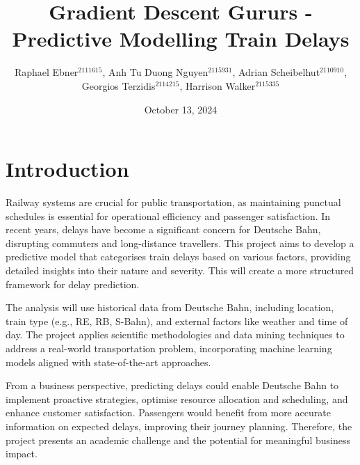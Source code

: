 \documentclass[a4paper,oneside,bibliography=totoc]{scrbook}
\begin{document}
\frontmatter \subject{Data Mining Project Outline HWS24} %
\title{Gradient Descent Gururs - Predictive Modelling Train Delays}
\author{Raphael Ebner$^{2111615}$, Anh Tu Duong Nguyen$^{2115931}$, Adrian Scheibelhut$^{2110910}$,\\ Georgios Terzidis$^{2114215}$, Harrison Walker$^{2115335}$} \date{October 13, 2024}
\publishers{{\small Submitted to}\\
Data and Web Science Group\\
Prof.\ Dr.\ Hertling\\
University of Mannheim\\}

\maketitle


\mainmatter

\chapter{Introduction}
\label{ch:intro}

Railway systems are crucial for public transportation,
as maintaining punctual schedules is essential for operational efficiency and passenger satisfaction.
In recent years, delays have become a significant concern for Deutsche Bahn,
disrupting commuters and long-distance travellers.
This project aims to develop a predictive model that categorises train delays based on various factors,
providing detailed insights into their nature and severity.
This will create a more structured framework for delay prediction.

The analysis will use historical data from Deutsche Bahn, including location,
train type (e.g., RE, RB, S-Bahn), and external factors like weather and time of day.
The project applies scientific methodologies and data mining techniques to address a real-world transportation problem,
incorporating machine learning models aligned with state-of-the-art approaches.

From a business perspective, predicting delays could enable Deutsche Bahn to implement proactive strategies,
optimise resource allocation and scheduling,
and enhance customer satisfaction.
Passengers would benefit from more accurate information on expected delays, improving their journey planning.
Therefore, the project presents an academic challenge and the potential for meaningful business impact.
\end{document}

